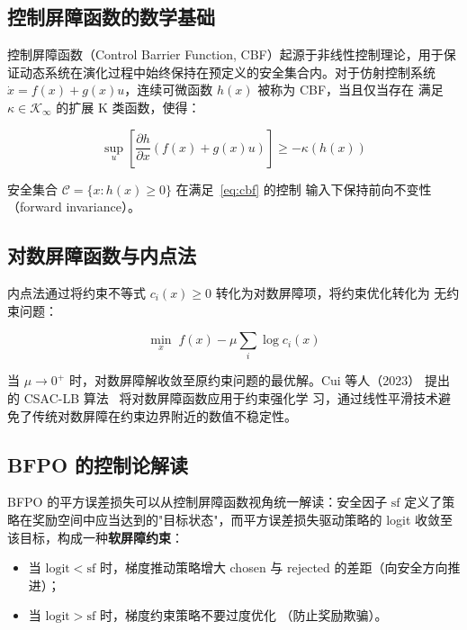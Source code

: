 \documentclass[12pt,a4paper,UTF8]{ctexart}
\begin{document}
\subsection{控制屏障函数的数学基础}

控制屏障函数（Control Barrier Function, CBF）起源于非线性控制理论，用于保
证动态系统在演化过程中始终保持在预定义的安全集合内。对于仿射控制系统
$\dot{x} = f(x) + g(x)u$，连续可微函数 $h(x)$ 被称为 CBF，当且仅当存在
满足 $\kappa\in\mathcal{K}_\infty$ 的扩展 K 类函数，使得：

\begin{equation}
  \sup_{u}\left[\frac{\partial h}{\partial x}(f(x)+g(x)u)\right]
    \geq -\kappa(h(x))
  \label{eq:cbf}
\end{equation}

安全集合 $\mathcal{C} = \{x : h(x)\geq 0\}$ 在满足~\eqref{eq:cbf} 的控制
输入下保持前向不变性（forward invariance）。

\subsection{对数屏障函数与内点法}

内点法通过将约束不等式 $c_i(x)\geq 0$ 转化为对数屏障项，将约束优化转化为
无约束问题：

\begin{equation}
  \min_x\; f(x) - \mu\sum_i\log c_i(x)
  \label{eq:log_barrier}
\end{equation}

当 $\mu\to 0^+$ 时，对数屏障解收敛至原约束问题的最优解。Cui 等人（2023）
提出的 CSAC-LB 算法~\cite{cui2023csaclb} 将对数屏障函数应用于约束强化学
习，通过线性平滑技术避免了传统对数屏障在约束边界附近的数值不稳定性。

\subsection{BFPO 的控制论解读}

BFPO 的平方误差损失可以从控制屏障函数视角统一解读：安全因子 $\mathrm{sf}$
定义了策略在奖励空间中应当达到的"目标状态"，而平方误差损失驱动策略的
logit 收敛至该目标，构成一种\textbf{软屏障约束}：
\begin{itemize}[leftmargin=2em]
  \item 当 $\mathrm{logit} < \mathrm{sf}$ 时，梯度推动策略增大 chosen 与
    rejected 的差距（向安全方向推进）；
  \item 当 $\mathrm{logit} > \mathrm{sf}$ 时，梯度约束策略不要过度优化
    （防止奖励欺骗）。
\end{itemize}
\end{document}
